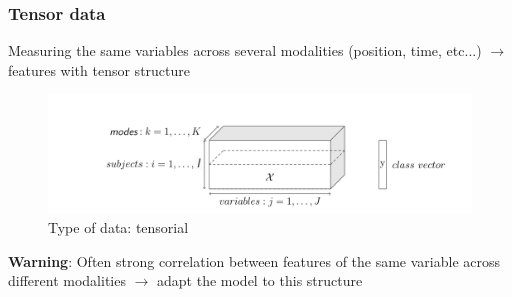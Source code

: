 \documentclass{beamer}
\begin{document}



    






\begin{frame}
    \frametitle{Tensor data}
  Measuring the same variables across several modalities (position, time, etc...) $\rightarrow$ features with tensor structure
    \begin{figure}
        \centering
        \includegraphics[scale = 0.23]{images/tensor_mode.png}
        \caption{Type of data: tensorial}
    \end{figure}

\textbf{Warning}: Often strong correlation between features of the same variable across different modalities $\rightarrow$ adapt the model to this structure
\end{frame}
\end{document}

